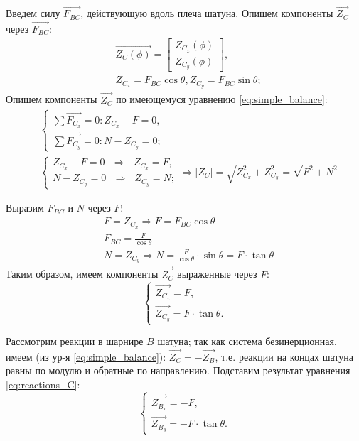 \documentclass[12pt]{extarticle}
\begin{document}
{{{{{{{{Введем силу $\vec{F_{BC}}$, действующую вдоль плеча шатуна. Опишем компоненты $\vec{Z_C}$ через $\vec{F_{BC}}$:
\begin{align*}
    & \vec{Z_{C}(\phi)}= \left[
       \begin{matrix}
           Z_{C_x} (\phi) \\ 
           Z_{C_y}(\phi)
       \end{matrix}
       \right], \\
    & Z_{C_x} = F_{BC} \cos{\theta},  Z_{C_y} =  F_{BC} \sin{\theta};
\end{align*}
Опишем компоненты $\vec{Z_C}$ по имеющемуся уравнению \ref{eq:simple_balance}:
\begin{align*}
    & \begin{cases} 
        \sum\limits{\vec{F_{C_x}}}=0: Z_{C_x} - F = 0, \\ 
        \sum\limits{\vec{F_{C_y}}}=0: N - Z_{C_y} = 0;
    \end{cases} \\
    & \begin{cases} 
        Z_{C_x} - F=0 \ \ \  \Rightarrow \ \ \ Z_{C_x}=F,\\ 
        N - Z_{C_y}=0 \ \ \  \Rightarrow \ \ \ Z_{C_y}=N;
    \end{cases} \Rightarrow \left| Z_{C} \right|=\sqrt{Z^{2}_{C_x}+Z^{2}_{C_y}}=\sqrt{F^{2}+ N^{2}}
\end{align*}

Выразим $F_{BC}$ и $N$ через $F$:
\begin{align*}
    & F=Z_{C_x} \Rightarrow F=F_{BC}\cos{\theta} \\
    & F_{BC}=\frac{F}{\cos{\theta}} \\
    & N=Z_{C_y} \Rightarrow N=\frac{F}{\cos{\theta}}\cdot\sin{\theta}=F \cdot \tan{\theta}
\end{align*}
Таким образом, имеем компоненты $\vec{Z_C}$ выраженные через $F$:
\begin{equation}
    \begin{cases} 
        \vec{Z_{C_x}}=F, \\ 
        \vec{Z_{C_y}}=F \cdot \tan{\theta}.
    \end{cases}
    \label{eq:reactions_C}
\end{equation}

Рассмотрим реакции в шарнире $B$ шатуна; так как система безинерционная, имеем (из ур-я \ref{eq:simple_balance}):
$\vec{Z_{C}}=-\vec{Z_{B}}$, т.е. реакции на концах шатуна равны по модулю и обратные по направлению.
Подставим результат уравнения \ref{eq:reactions_C}:
\begin{equation}
    \begin{cases} 
        \vec{Z_{B_x}}=-F, \\ 
        \vec{Z_{B_y}}=-F \cdot \tan{\theta}.
    \end{cases}
    \label{eq:reactions_B}
\end{equation}

}}}}}}}}
\end{document}
